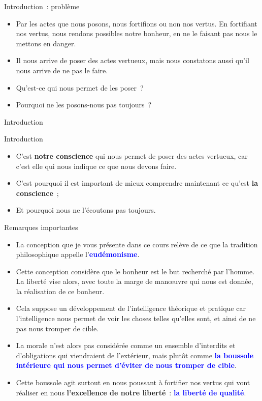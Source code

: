 \documentclass[11pt,xcolor=dvipsname,ignorenonframetext,handout]{beamer}
\begin{document}
\begin{frame}{Introduction~: problème}
    \begin{itemize}
        \rightskip=0pt\leftskip=0pt
        \item Par les actes que nous posons, nous fortifions ou non nos vertus. En fortifiant nos vertus, nous rendons possibles notre bonheur, en ne le faisant pas nous le mettons en danger.
        \item Il nous arrive de poser des actes vertueux, mais nous constatons aussi qu'il nous arrive de ne pas le faire.
        \item Qu'est-ce qui nous permet de les poser~?
        \item Pourquoi ne les posons-nous pas toujours~?
    \end{itemize}
\end{frame}{Introduction}
\begin{frame}{Introduction}
    \begin{itemize}
        \rightskip=0pt\leftskip=0pt
        \item C'est \textbf{notre conscience} qui nous permet de poser des actes vertueux, car c'est elle qui nous indique ce que nous devons faire.
        \item C'est pourquoi il est important de mieux comprendre maintenant ce qu'est \textbf{la conscience}~;
        \item Et pourquoi nous ne l'écoutons pas toujours.
    \end{itemize}
\end{frame}
\begin{frame}{Remarques importantes}
    \begin{itemize}
    \rightskip=0pt\leftskip=0pt    
    \item La conception que je vous présente dans ce cours relève de ce que la tradition philosophique appelle l'\textcolor{blue}{\textbf{eudémonisme}}.
    \item Cette conception considère que le bonheur est le but recherché par l'homme. La liberté vise alors, avec toute la marge de manœuvre qui nous est donnée, la réalisation de ce bonheur. 
    \item Cela suppose un développement de l'intelligence théorique et pratique car l'intelligence nous permet de voir les choses telles qu'elles sont, et ainsi de ne pas nous tromper de cible. 
    \item La morale n'est alors pas considérée comme un ensemble d'interdits et d'obligations qui viendraient de l'extérieur, mais plutôt comme \textcolor{blue}{\textbf{la boussole intérieure qui nous permet d'éviter de nous tromper de cible}}.
    \item Cette boussole agit surtout en nous poussant à fortifier nos vertus qui vont réaliser en nous \textbf{l'excellence de notre liberté}~: \textcolor{blue}{\textbf{la liberté de qualité}}.
    \end{itemize}
\end{frame}
\end{document}
